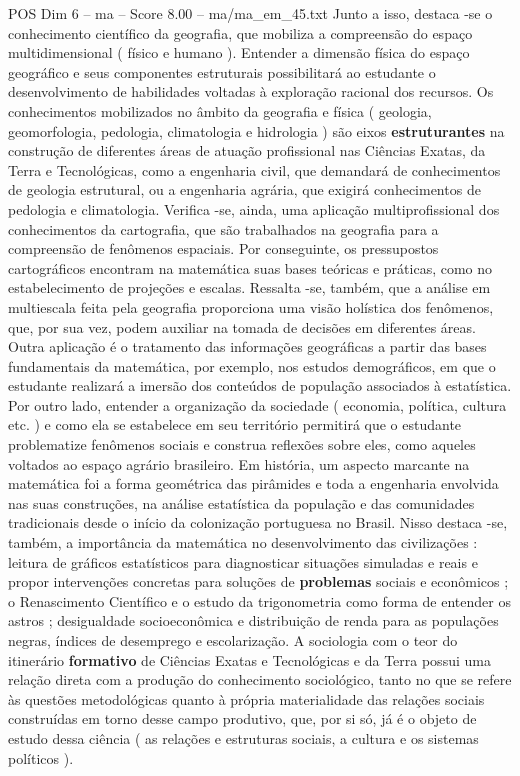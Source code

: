 \begin{textsample}{POS Dim 6 – ma – Score 8.00 – ma/ma\_em\_45.txt}
Junto a isso, destaca -se o conhecimento científico da geografia, que mobiliza a compreensão do espaço multidimensional ( físico e humano ).
Entender a dimensão física do espaço geográfico e seus componentes estruturais possibilitará ao estudante o desenvolvimento de habilidades voltadas à exploração racional dos recursos.
Os conhecimentos mobilizados no âmbito da geografia e física ( geologia, geomorfologia, pedologia, climatologia e hidrologia ) são eixos \textbf{estruturantes} na construção de diferentes áreas de atuação profissional nas Ciências Exatas, da Terra e Tecnológicas, como a engenharia civil, que demandará de conhecimentos de geologia estrutural, ou a engenharia agrária, que exigirá conhecimentos de pedologia e climatologia.
Verifica -se, ainda, uma aplicação multiprofissional dos conhecimentos da cartografia, que são trabalhados na geografia para a compreensão de fenômenos espaciais.
Por conseguinte, os pressupostos cartográficos encontram na matemática suas bases teóricas e práticas, como no estabelecimento de projeções e escalas.
Ressalta -se, também, que a análise em multiescala feita pela geografia proporciona uma visão holística dos fenômenos, que, por sua vez, podem auxiliar na tomada de decisões em diferentes áreas.
Outra aplicação é o tratamento das informações geográficas a partir das bases fundamentais da matemática, por exemplo, nos estudos demográficos, em que o estudante realizará a imersão dos conteúdos de população associados à estatística.
Por outro lado, entender a organização da sociedade ( economia, política, cultura etc. ) e como ela se estabelece em seu território permitirá que o estudante problematize fenômenos sociais e construa reflexões sobre eles, como aqueles voltados ao espaço agrário brasileiro.
Em história, um aspecto marcante na matemática foi a forma geométrica das pirâmides e toda a engenharia envolvida nas suas construções, na análise estatística da população e das comunidades tradicionais desde o início da colonização portuguesa no Brasil.
Nisso destaca -se, também, a importância da matemática no desenvolvimento das civilizações : leitura de gráficos estatísticos para diagnosticar situações simuladas e reais e propor intervenções concretas para soluções de \textbf{problemas} sociais e econômicos ; o Renascimento Científico e o estudo da trigonometria como forma de entender os astros ; desigualdade socioeconômica e distribuição de renda para as populações negras, índices de desemprego e escolarização.
A sociologia com o teor do itinerário \textbf{formativo} de Ciências Exatas e Tecnológicas e da Terra possui uma relação direta com a produção do conhecimento sociológico, tanto no que se refere às questões metodológicas quanto à própria materialidade das relações sociais construídas em torno desse campo produtivo, que, por si só, já é o objeto de estudo dessa ciência ( as relações e estruturas sociais, a cultura e os sistemas políticos ).

\end{textsample}

